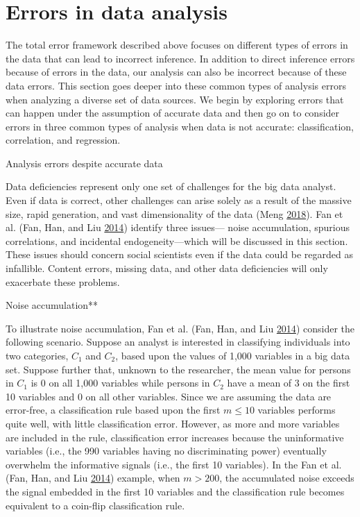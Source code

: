 \documentclass[]{krantz}
\begin{document}
\section{Errors in data analysis}\label{sec:10-4}

The total error framework described above focuses on different types of
errors in the data that can lead to incorrect inference. In addition to
direct inference errors because of errors in the data, our analysis can
also be incorrect because of these data errors. This section goes deeper
into these common types of analysis errors when analyzing a diverse set
of data sources. We begin by exploring errors that can happen under the
assumption of accurate data and then go on to consider errors in three
common types of analysis when data is not accurate: classification,
correlation, and regression.

Analysis errors despite accurate data

Data deficiencies represent only one set of challenges for the big data
analyst. Even if data is correct, other challenges can arise solely as a
result of the massive size, rapid generation, and vast dimensionality of
the data (Meng \protect\hyperlink{ref-meng2018}{2018}). Fan et al. (Fan,
Han, and Liu \protect\hyperlink{ref-fan2014challenges}{2014}) identify
three issues--- noise accumulation, spurious correlations, and
incidental endogeneity---which will be discussed in this section. These
issues should concern social scientists even if the data could be
regarded as infallible. Content errors, missing data, and other data
deficiencies will only exacerbate these problems.

Noise accumulation**

To illustrate noise accumulation, Fan et al. (Fan, Han, and Liu
\protect\hyperlink{ref-fan2014challenges}{2014}) consider the following
scenario. Suppose an analyst is interested in classifying individuals
into two categories, \(C_{1}\) and \(C_{2}\), based upon the values of
1,000 variables in a big data set. Suppose further that, unknown to the
researcher, the mean value for persons in \(C_{1}\) is 0 on all 1,000
variables while persons in \(C_{2}\) have a mean of 3 on the first 10
variables and 0 on all other variables. Since we are assuming the data
are error-free, a classification rule based upon the first \(m \le 10\)
variables performs quite well, with little classification error.
However, as more and more variables are included in the rule,
classification error increases because the uninformative variables
(i.e., the 990 variables having no discriminating power) eventually
overwhelm the informative signals (i.e., the first 10 variables). In the
Fan et al. (Fan, Han, and Liu
\protect\hyperlink{ref-fan2014challenges}{2014}) example, when
\(m > 200\), the accumulated noise exceeds the signal embedded in the
first 10 variables and the classification rule becomes equivalent to a
coin-flip classification rule.
\end{document}
